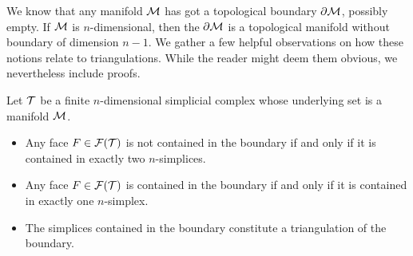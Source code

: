 \documentclass[10pt,letterpaper]{article}
\begin{document}
We know that any manifold ${\mathcal M}$ has got a topological boundary $\partial{\mathcal M}$, possibly empty. 
If ${\mathcal M}$ is $n$-dimensional, then the $\partial{\mathcal M}$ is a topological manifold without boundary of dimension $n-1$. 
We gather a few helpful observations on how these notions relate to triangulations.
While the reader might deem them obvious, we nevertheless include proofs. 

\begin{lemma}\label{lemma:boundarysimplices}
    Let ${\mathcal T}$ be a finite $n$-dimensional simplicial complex whose underlying set is a manifold ${\mathcal M}$. 
    \begin{itemize}
        \item Any face $F \in {\mathcal F}({\mathcal T})$ is not contained in the boundary if and only if it is contained in exactly two $n$-simplices.
        \item Any face $F \in {\mathcal F}({\mathcal T})$ is contained in the boundary if and only if it is contained in exactly one $n$-simplex.
        \item The simplices contained in the boundary constitute a triangulation of the boundary.
    \end{itemize}
\end{lemma}
\end{document}
